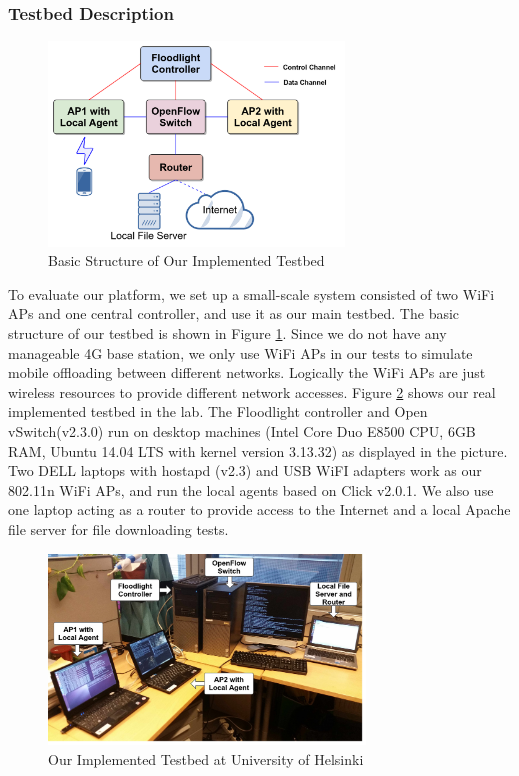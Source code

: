 \documentclass[english]{tktltiki}
\begin{document}
\subsubsection{Testbed Description}

\begin{figure}[htbp]
  \centering
  \includegraphics[width=0.7\textwidth]{images/system.png}
  \caption{Basic Structure of Our Implemented Testbed}
  \label{fig:system}
\end{figure}

To evaluate our platform, we set up a small-scale system consisted of two WiFi APs and one central controller, and use it as our main testbed. The basic structure of our testbed is shown in Figure \ref{fig:system}. Since we do not have any manageable 4G base station, we only use WiFi APs in our tests to simulate mobile offloading between different networks. Logically the WiFi APs are just wireless resources to provide different network accesses. Figure \ref{fig:testbed} shows our real implemented testbed in the lab. The Floodlight controller and Open vSwitch(v2.3.0) run on desktop machines (Intel Core Duo E8500 CPU, 6GB RAM, Ubuntu 14.04 LTS with kernel version 3.13.32) as displayed in the picture. Two DELL laptops with hostapd (v2.3) and USB WiFI adapters work as our 802.11n WiFi APs, and run the local agents based on Click v2.0.1. We also use one laptop acting as a router to provide access to the Internet and a local Apache file server for file downloading tests.


\begin{figure}[htbp]
  \centering
  \includegraphics[width=0.75\textwidth]{images/testbed.jpg}
  \caption{Our Implemented Testbed at University of Helsinki}
  \label{fig:testbed}
\end{figure}
\end{document}
